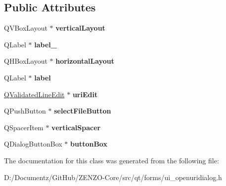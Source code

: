 \subsection*{Public Attributes}
\begin{DoxyCompactItemize}
\item 
\mbox{\label{class_ui___open_u_r_i_dialog_a49fa4f13a2f7504f84853cb215c87a96}} 
Q\+V\+Box\+Layout $\ast$ {\bfseries vertical\+Layout}
\item 
\mbox{\label{class_ui___open_u_r_i_dialog_a9f0599556931f01d854d5af9d2948c67}} 
Q\+Label $\ast$ {\bfseries label\+\_}
\item 
\mbox{\label{class_ui___open_u_r_i_dialog_a0c66cc8c83bf4d42b7e5f30d4a335708}} 
Q\+H\+Box\+Layout $\ast$ {\bfseries horizontal\+Layout}
\item 
\mbox{\label{class_ui___open_u_r_i_dialog_a88ebc5cdbf5f84d4de1242f65925bf1b}} 
Q\+Label $\ast$ {\bfseries label}
\item 
\mbox{\label{class_ui___open_u_r_i_dialog_ab9afabaed0572443e9b892f8e14cea69}} 
\mbox{\hyperlink{class_q_validated_line_edit}{Q\+Validated\+Line\+Edit}} $\ast$ {\bfseries uri\+Edit}
\item 
\mbox{\label{class_ui___open_u_r_i_dialog_ac854ec64539d7f35efe823c9945368cc}} 
Q\+Push\+Button $\ast$ {\bfseries select\+File\+Button}
\item 
\mbox{\label{class_ui___open_u_r_i_dialog_a3548f1603d64756e0be14dea93912be7}} 
Q\+Spacer\+Item $\ast$ {\bfseries vertical\+Spacer}
\item 
\mbox{\label{class_ui___open_u_r_i_dialog_a5693619c5c060bd73d95fb68736e89d2}} 
Q\+Dialog\+Button\+Box $\ast$ {\bfseries button\+Box}
\end{DoxyCompactItemize}


The documentation for this class was generated from the following file\+:\begin{DoxyCompactItemize}
\item 
D\+:/\+Documentz/\+Git\+Hub/\+Z\+E\+N\+Z\+O-\/\+Core/src/qt/forms/ui\+\_\+openuridialog.\+h\end{DoxyCompactItemize}
